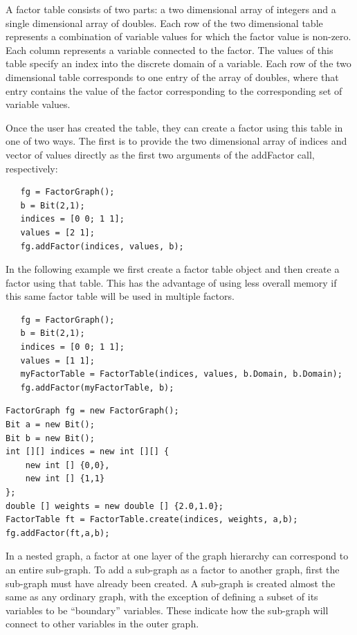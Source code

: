 A factor table consists of two parts: a two dimensional array of integers and a single dimensional array of doubles.  Each row of the two dimensional table represents a combination of variable values for which the factor value is non-zero.  Each column represents a variable connected to the factor. The values of this table specify an index into the discrete domain of a variable. Each row of the two dimensional table corresponds to one entry of the array of doubles, where that entry contains the value of the factor corresponding to the corresponding set of variable values.

Once the user has created the table, they can create a factor using this table in one of two ways. The first is to provide the two dimensional array of indices and vector of values directly as the first two arguments of the addFactor call, respectively:

\ifmatlab

\begin{lstlisting}
   fg = FactorGraph();
   b = Bit(2,1);
   indices = [0 0; 1 1];
   values = [2 1];
   fg.addFactor(indices, values, b);
\end{lstlisting}
   
In the following example we first create a factor table object and then create a factor using that table. This has the advantage of using less overall memory if this same factor table will be used in multiple factors.

\begin{lstlisting}
   fg = FactorGraph();
   b = Bit(2,1);   
   indices = [0 0; 1 1];
   values = [1 1];
   myFactorTable = FactorTable(indices, values, b.Domain, b.Domain);	
   fg.addFactor(myFactorTable, b);
\end{lstlisting}
   
\fi

\ifjava
\begin{lstlisting}
FactorGraph fg = new FactorGraph();
Bit a = new Bit();
Bit b = new Bit();
int [][] indices = new int [][] {
	new int [] {0,0},
	new int [] {1,1}
};
double [] weights = new double [] {2.0,1.0};
FactorTable ft = FactorTable.create(indices, weights, a,b);
fg.addFactor(ft,a,b);
\end{lstlisting}
\fi
   


\label{sec:usingSubGraphs}

In a nested graph, a factor at one layer of the graph hierarchy can correspond to an entire sub-graph.  To add a sub-graph as a factor to another graph, first the sub-graph must have already been created.  A sub-graph is created almost the same as any ordinary graph, with the exception of defining a subset of its variables to be ``boundary'' variables.  These indicate how the sub-graph will connect to other variables in the outer graph.

